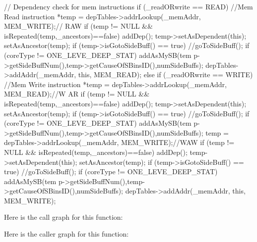\begin{DoxyCode}
                                                                                 
                             {
        // Dependency check for mem instructions
        if (_readORwrite == READ) { //Mem Read
                instruction *temp = depTables->addrLookup(_memAddr, MEM_WRITE);//
      RAW
                if (temp != NULL && isRepeated(temp,_ancestors)==false) {
                        addDep();
                        temp->setAsDependent(this);
                        setAsAncestor(temp);
                        if (temp->isGotoSideBuff() == true) {
                                //goToSideBuff();
                                if (coreType != ONE_LEVE_DEEP_STAT) addAsMySB(tem
      p->getSideBuffNum(),temp->getCauseOfSBinsID(),numSideBuffs);
                        }
                }
                depTables->addAddr(_memAddr, this, MEM_READ);
        } else if (_readORwrite == WRITE) { //Mem Write
                instruction *temp = depTables->addrLookup(_memAddr, MEM_READ);//W
      AR
                if (temp != NULL && isRepeated(temp,_ancestors)==false) {
                        addDep();
                        temp->setAsDependent(this);
                        setAsAncestor(temp);
                        if (temp->isGotoSideBuff() == true) {
                                //goToSideBuff();
                                if (coreType != ONE_LEVE_DEEP_STAT) addAsMySB(tem
      p->getSideBuffNum(),temp->getCauseOfSBinsID(),numSideBuffs);
                        }
                }
                temp = depTables->addrLookup(_memAddr, MEM_WRITE);//WAW
                if (temp != NULL && isRepeated(temp,_ancestors)==false) {
                        addDep();
                        temp->setAsDependent(this);
                        setAsAncestor(temp);
                        if (temp->isGotoSideBuff() == true) {
                                //goToSideBuff();
                                if (coreType != ONE_LEVE_DEEP_STAT) addAsMySB(tem
      p->getSideBuffNum(),temp->getCauseOfSBinsID(),numSideBuffs);
                        }
                }
                depTables->addAddr(_memAddr, this, MEM_WRITE);
        }
}
\end{DoxyCode}


Here is the call graph for this function:




Here is the caller graph for this function:


